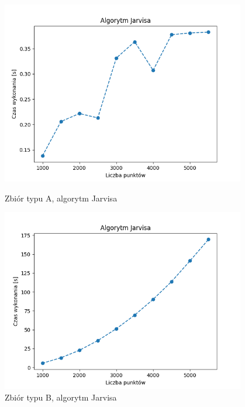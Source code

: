 \documentclass[11pt]{article}
\theoremstyle{remark} \newtheorem{definition}{def.}
\theoremstyle{definition} \newtheorem{twierdzenie}{tw.}
\begin{document}
\begin{figure}[]
    \centering
    \begin{minipage}{0.48\textwidth}
        \centering
        \includegraphics[width=0.95\textwidth]{../tests/chmura-jarvis.png} %
        \caption{Zbiór typu A, algorytm Jarvisa}
        \label{fig:chmura-jarvis}
    \end{minipage}\hfill
    \begin{minipage}{0.48\textwidth}
        \centering
        \includegraphics[width=0.95\textwidth]{../tests/okrag-jarvis.png} %
        \caption{Zbiór typu B, algorytm Jarvisa}
        \label{fig:okrag-jarvis}
    \end{minipage}
\end{figure}
\end{document}
